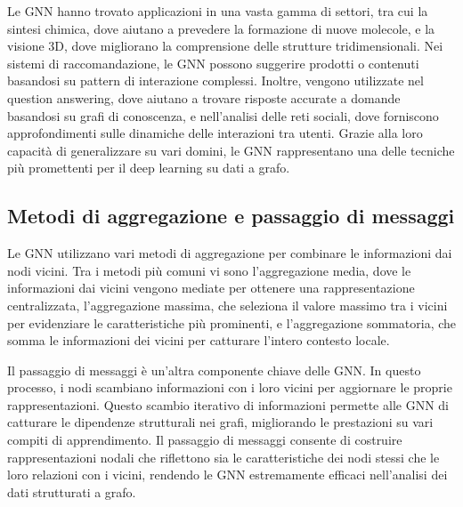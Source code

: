 \documentclass{article}
\begin{document}
Le GNN hanno trovato applicazioni in una vasta gamma di settori, tra cui la sintesi chimica, dove aiutano a prevedere la formazione di nuove molecole, e la visione 3D, dove migliorano la comprensione delle strutture tridimensionali. Nei sistemi di raccomandazione, le GNN possono suggerire prodotti o contenuti basandosi su pattern di interazione complessi. Inoltre, vengono utilizzate nel question answering, dove aiutano a trovare risposte accurate a domande basandosi su grafi di conoscenza, e nell'analisi delle reti sociali, dove forniscono approfondimenti sulle dinamiche delle interazioni tra utenti. Grazie alla loro capacità di generalizzare su vari domini, le GNN rappresentano una delle tecniche più promettenti per il deep learning su dati a grafo.

\subsection{Metodi di aggregazione e passaggio di messaggi}

Le GNN utilizzano vari metodi di aggregazione per combinare le informazioni dai nodi vicini. Tra i metodi più comuni vi sono l'aggregazione media, dove le informazioni dai vicini vengono mediate per ottenere una rappresentazione centralizzata, l'aggregazione massima, che seleziona il valore massimo tra i vicini per evidenziare le caratteristiche più prominenti, e l'aggregazione sommatoria, che somma le informazioni dei vicini per catturare l'intero contesto locale.

Il passaggio di messaggi è un'altra componente chiave delle GNN. In questo processo, i nodi scambiano informazioni con i loro vicini per aggiornare le proprie rappresentazioni. Questo scambio iterativo di informazioni permette alle GNN di catturare le dipendenze strutturali nei grafi, migliorando le prestazioni su vari compiti di apprendimento. Il passaggio di messaggi consente di costruire rappresentazioni nodali che riflettono sia le caratteristiche dei nodi stessi che le loro relazioni con i vicini, rendendo le GNN estremamente efficaci nell'analisi dei dati strutturati a grafo.
\end{document}
